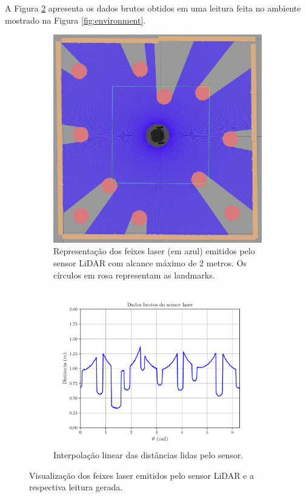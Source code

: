 A Figura \ref{fig:sensor-raw-data} apresenta os dados brutos obtidos em uma 
leitura feita no ambiente mostrado na Figura \ref{fig:environment}.
\begin{figure}[]
  \centering
  \begin{subfigure}{0.39\textwidth}
    \includegraphics[width=\textwidth]{figs/sensor-simulation-view-tiny.png}
    \caption{Representação dos feixes laser (em azul) emitidos pelo sensor LiDAR com 
    alcance máximo de 2 metros. Os círculos em rosa representam as landmarks.}
    \label{fig:laser-beams-visualization}
  \end{subfigure}
  \hfill
  \begin{subfigure}{0.60\textwidth}
    \includegraphics[width=\textwidth]{figs/raw_sensor_data.pdf}
    \caption{Interpolação linear das distâncias lidas pelo sensor.}
    \label{fig:sensor-raw-data}
  \end{subfigure}
  \caption[Exemplo de uma sequência de distâncias lida pelo sensor LiDAR]{Visualização dos feixes laser emitidos pelo sensor LiDAR e a 
  respectiva leitura gerada.}
  \label{fig:sensor-visualization-and-reading}
\end{figure}


